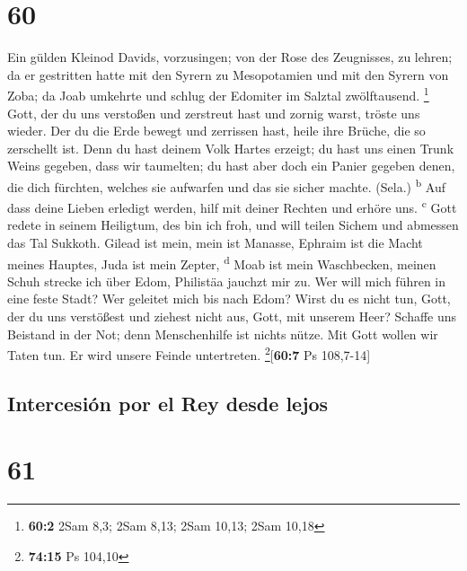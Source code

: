 \hypertarget{section-59}{%
\section{60}\label{section-59}}

 Ein gülden Kleinod Davids, vorzusingen; von der Rose des
Zeugnisses, zu lehren;  da er gestritten hatte mit den
Syrern zu Mesopotamien und mit den Syrern von Zoba; da Joab umkehrte und
schlug der Edomiter im Salztal zwölftausend. \footnote{\textbf{60:2}
  2Sam 8,3; 2Sam 8,13; 2Sam 10,13; 2Sam 10,18}  Gott, der
du uns verstoßen und zerstreut hast und zornig warst, tröste uns wieder.
 Der du die Erde bewegt und zerrissen hast, heile ihre
Brüche, die so zerschellt ist.  Denn du hast deinem Volk
Hartes erzeigt; du hast uns einen Trunk Weins gegeben, dass wir
taumelten;  du hast aber doch ein Panier gegeben denen,
die dich fürchten, welches sie aufwarfen und das sie sicher machte.
(Sela.) \textsuperscript{b}  Auf dass deine Lieben
erledigt werden, hilf mit deiner Rechten und erhöre uns.
\textsuperscript{c}  Gott redete in seinem Heiligtum, des
bin ich froh, und will teilen Sichem und abmessen das Tal Sukkoth.
 Gilead ist mein, mein ist Manasse, Ephraim ist die Macht
meines Hauptes, Juda ist mein Zepter, \textsuperscript{d}
 Moab ist mein Waschbecken, meinen Schuh strecke ich über
Edom, Philistäa jauchzt mir zu.  Wer will mich führen in
eine feste Stadt? Wer geleitet mich bis nach Edom?  Wirst
du es nicht tun, Gott, der du uns verstößest und ziehest nicht aus,
Gott, mit unserem Heer?  Schaffe uns Beistand in der Not;
denn Menschenhilfe ist nichts nütze.  Mit Gott wollen wir
Taten tun. Er wird unsere Feinde untertreten.
\footnote{\textbf{74:15} Ps 104,10}{[}\textbf{60:7} Ps 108,7-14{]}

\hypertarget{intercesiuxf3n-por-el-rey-desde-lejos}{%
\subsection{Intercesión por el Rey desde
lejos}\label{intercesiuxf3n-por-el-rey-desde-lejos}}

\hypertarget{section-60}{%
\section{61}\label{section-60}}

